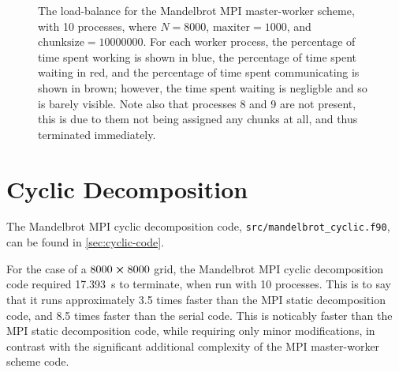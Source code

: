 \documentclass{article}
\begin{document}
\begin{figure}[h]
  \centering
  \caption{The load-balance for the Mandelbrot MPI master-worker scheme,
    with 10 processes, where $N = 8000$, $\mathrm{maxiter} = 1000$, and
    $\mathrm{chunksize} = 10000000$. For each worker process, the percentage of
    time spent working is shown in blue, the percentage of time spent waiting in
    red, and the percentage of time spent communicating is shown in brown;
    however, the time spent waiting is negligble and so is barely visible.
    Note also that processes 8 and 9 are not present, this is due to them not
    being assigned any chunks at all, and thus terminated immediately.}
  \label{fig:master-load-balance-10000000}
\end{figure}

\clearpage
\section{Cyclic Decomposition}
\label{sec:cyclic}

The Mandelbrot MPI cyclic decomposition code,
\lstinline[style=ff]{src/mandelbrot_cyclic.f90}, can be found in
\autoref{sec:cyclic-code}.

For the case of a $8000 \cross 8000$ grid, the Mandelbrot MPI cyclic
decomposition code required \SI{17.393}{\second} to terminate, when run with 10
processes.
This is to say that it runs approximately 3.5 times faster than the MPI static
decomposition code, and 8.5 times faster than the serial code.
This is noticably faster than the MPI static decomposition code, while requiring
only minor modifications, in contrast with the significant additional complexity
of the MPI master-worker scheme code.
\end{document}

